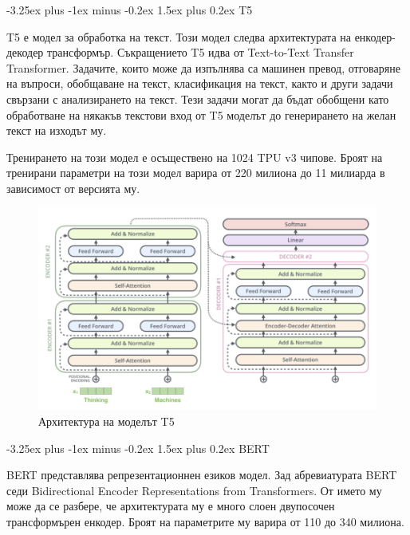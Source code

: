 \documentclass{article}
\makeatletter
\newcounter{subsubsubsection}[subsubsection]
\renewcommand\paragraph{\@startsection{paragraph}{5}{\z@}%
{3.25ex \@plus1ex \@minus.2ex}%
{-1em}%
{\normalfont\normalsize\bfseries}}
\renewcommand{\paragraph}{\@startsection{paragraph}{4}{0ex}%
{-3.25ex plus -1ex minus -0.2ex}%
{1.5ex plus 0.2ex}%
{\normalfont\normalsize\bfseries}}
\makeatother
\begin{document}

\paragraph{T5}

T5 е модел за обработка на текст. Този модел следва архитектурата на енкодер-декодер трансформър. Съкращението T5 идва
от Text-to-Text Transfer Transformer. Задачите, които може да изпълнява са машинен превод, отговаряне на въпроси,
обобщаване на текст, класификация на текст, както и други задачи свързани с анализирането на текст. Тези задачи могат
да бъдат обобщени като обработване на някакъв текстови вход от T5 моделът до генерирането на желан текст на изходът му.

Тренирането на този модел е осъществено на 1024 TPU v3 чипове. Броят на тренирани параметри на този модел варира от 220
милиона до 11 милиарда в зависимост от версията му. \cite{t5}

\begin{figure}[H]
  \centering
  \captionsetup{justification=centering}
  \includegraphics[width=450px, keepaspectratio]{chapter-02/t5.png}
  \caption{Архитектура на моделът T5}
\end{figure}

\paragraph{BERT}

BERT представлява репрезентационнен езиков модел. Зад абревиатурата BERT седи Bidirectional Encoder Representations
from Transformers. От името му може да се разбере, че архитектурата му е много слоен двупосочен трансформърен енкодер.
Броят на параметрите му варира от 110 до 340 милиона. \cite{bert}
\end{document}
